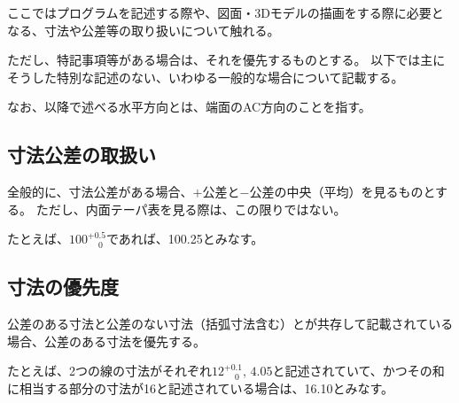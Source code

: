 
ここではプログラムを記述する際や、図面・3Dモデルの描画をする際に必要となる、寸法や公差等の取り扱いについて触れる。

ただし、特記事項等がある場合は、それを優先するものとする。
以下では主にそうした特別な記述のない、いわゆる一般的な場合について記載する。

なお、以降で述べる水平方向とは、端面のAC方向のことを指す。





\subsection{寸法公差の取扱い}
全般的に、寸法公差がある場合、$+$公差と$-$公差の中央（平均）を見るものとする。
ただし、内面テーパ表を見る際は、この限りではない。

たとえば、$100^{+0.5}_{\phantom -0}$であれば、100.25とみなす。


\subsection{寸法の優先度}
公差のある寸法と公差のない寸法（括弧寸法含む）とが共存して記載されている場合、公差のある寸法を優先する。

たとえば、2つの線の寸法がそれぞれ$12^{+0.1}_{\phantom -0}$, $4.05$と記述されていて、かつその和に相当する部分の寸法が16と記述されている場合は、16.10とみなす。



\clearpage


